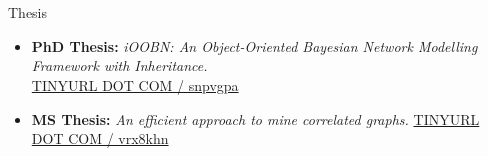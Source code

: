 \section{\faBook}{Thesis}
\begin{itemize}[noitemsep]
    \item \textbf{PhD Thesis:} {\em iOOBN: An Object-Oriented Bayesian Network Modelling Framework with Inheritance.}\\ \href{https://tinyurl.com/snpvgpa}{TINYURL DOT COM / snpvgpa}
    \item \textbf{MS Thesis:} {\em An efficient approach to mine correlated graphs.} \href{https://tinyurl.com/vrx8khn}{TINYURL DOT COM / vrx8khn}
\end{itemize}